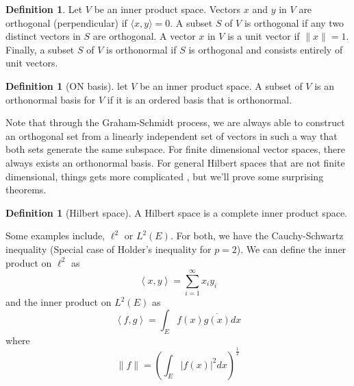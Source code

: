 \documentclass[13pt]{article}
\newcommand{\inprod}[1]{\left\langle #1 \right\rangle}
\theoremstyle{definition} --- default
\theoremstyle{definition}
\newtheorem{definition}[theorem]{Definition}
\theoremstyle{remark}
\begin{document}
\begin{definition}
Let \( V \) be an inner product space. Vectors \( x \) and \( y \) in \( V \) are orthogonal (perpendicular) if \( \langle x, y \rangle = 0 \). A subset \( S \) of \( V \) is orthogonal if any two distinct vectors in \( S \) are orthogonal. A vector \( x \) in \( V \) is a unit vector if \( \|x\| = 1 \). Finally, a subset \( S \) of \( V \) is orthonormal if \( S \) is orthogonal and consists entirely of unit vectors.
\end{definition}
\begin{definition}[ON basis]
	let $V$ be an inner product space. A subset of $V$ is an orthonormal basis for $V$ if it is an ordered basis that is orthonormal.
\end{definition}
Note that through the Graham-Schmidt process, we are always able to construct an orthogonal set from a linearly independent set of vectors in such a way that both sets generate the same subspace. For finite dimensional vector spaces, there always exists an orthonormal basis. For general Hilbert spaces that are not finite dimensional, things gets more complicated , but we'll prove some surprising theorems. 

\begin{definition}[Hilbert space]
	A Hilbert space is a complete inner product space. 
\end{definition}
Some examples include, $\ell^2$ or $L^2(E)$. For both, we have the Cauchy-Schwartz inequality (Special case of Holder's inequality for $p=2$). We can define the inner product on $\ell^2$ as 
$$
	\inprod{x,y} = \sum_{i=1}^\infty x_i y_i 
$$
and the inner product on $L^2(E)$ as
$$
\inprod{f,g} = \int_E f(x)\overline{g(x)}dx 
$$
where
$$
\|f\| = \left(\int_{E} |f(x)|^2 dx\right)^{\frac{1}{2}}
$$
\end{document}

